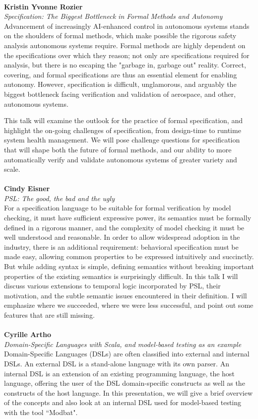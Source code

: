 \documentclass{article}
\newcounter{talkc}
\newcommand{\talk}[3]{\stepcounter{talkc}
\vspace{0.5em}~\\
\noindent
\textbf{#1}\\ 
\noindent\emph{#2}\\ 
\noindent#3\\
}
\begin{document}
\talk{Kristin Yvonne Rozier} {Specification: The Biggest Bottleneck in Formal Methods and Autonomy}{Advancement of increasingly AI-enhanced control in autonomous systems stands on the shoulders of formal methods, which make possible the rigorous safety analysis autonomous systems require. Formal methods are highly dependent on the specifications over which they reason; not only are specifications required for analysis, but there is no escaping the "garbage in, garbage out" reality. Correct, covering, and formal specifications are thus an essential element for enabling autonomy. However, specification is difficult, unglamorous, and arguably the biggest bottleneck facing verification and validation of aerospace, and other, autonomous systems. 

This talk will examine the outlook for the practice of formal specification, and highlight the on-going challenges of specification, from design-time to runtime system health management. We will pose challenge questions for specification that will shape both the future of formal methods, and our ability to more automatically verify and validate autonomous systems of greater variety and scale. }
%
\talk{Cindy Eisner}{PSL: The good, the bad and the ugly}{For a specification language to be suitable for formal verification by model checking, it must have sufficient expressive power, its semantics must be formally defined in a rigorous manner, and the complexity of model checking it must be well understood and reasonable. In order to allow widespread adoption in the industry, there is an additional requirement: behavioral specification must be made easy, allowing common properties to be expressed intuitively and succinctly. But while adding syntax is simple, defining semantics without breaking important properties of the existing semantics is surprisingly difficult. In this talk I will discuss various extensions to temporal logic incorporated by PSL, their motivation, and the subtle semantic issues encountered in their definition. I will emphasize where we succeeded, where we were less successful, and point out some features that are still missing.}
%
\talk{Cyrille Artho}{Domain-Specific Languages with Scala, and model-based testing as an example}
{Domain-Specific Languages (DSLs) are often classified into external and internal DSLs. An external DSL is a stand-alone language with its own parser. An internal DSL is an extension of an existing programming language, the host language, offering the user of the DSL domain-specific constructs as well as the constructs of the host language. In this presentation, we will give a brief overview of the concepts and also look at an internal DSL used for model-based testing with the tool ``Modbat".}
\end{document}
